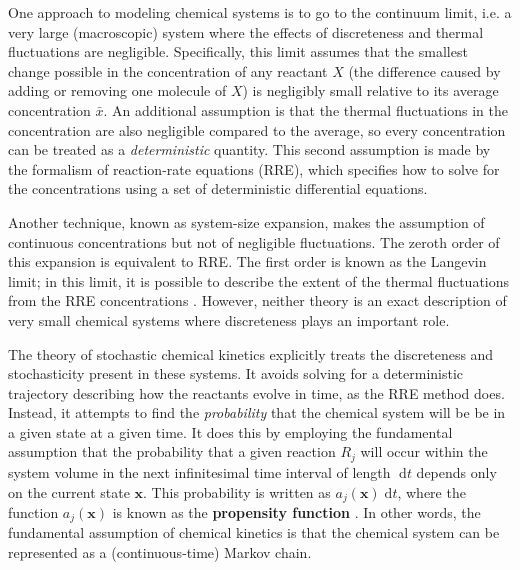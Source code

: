 \documentclass[english,letterpaper,12pt]{report}
\newcommand{\defkeywd}[1]{\textbf{#1}}
\newcommand{\dee}{\;\mathrm{d}}
\renewcommand{\vec}[1]{\ensuremath{\mathbf{#1}}}
\begin{document}
\begin{doublespacing}
One approach to modeling chemical systems is to go to the continuum limit, i.e. a very large (macroscopic) system where the effects of discreteness and thermal fluctuations are negligible. Specifically, this limit assumes that the smallest change possible in the concentration of any reactant $X$ (the difference caused by adding or removing one molecule of $X$) is negligibly small relative to its average concentration $\bar{x}$. An additional assumption is that the thermal fluctuations in the concentration are also negligible compared to the average, so every concentration can be treated as a \emph{deterministic} quantity. This second assumption is made by the formalism of reaction-rate equations (RRE), which specifies how to solve for the concentrations using a set of deterministic differential equations. 

Another technique, known as system-size expansion, makes the assumption of continuous concentrations but not of negligible fluctuations. The zeroth order of this expansion is equivalent to RRE. The first order is known as the Langevin limit; in this limit, it is possible to describe the extent of the thermal fluctuations from the RRE concentrations \cite{langevin-limit}. However, neither theory is an exact description of very small chemical systems where discreteness plays an important role.

The theory of stochastic chemical kinetics explicitly treats the discreteness and stochasticity present in these systems. It avoids solving for a deterministic trajectory describing how the reactants evolve in time, as the RRE method does. Instead, it attempts to find the \emph{probability} that the chemical system will be be in a given state at a given time. It does this by employing the fundamental assumption that the probability that a given reaction $R_j$ will occur within the system volume in the next infinitesimal time interval of length $\dee t$ depends only on the current state $\vec{x}$. This probability is written as $a_j(\vec{x}) \dee t$, where the function $a_j(\vec{x})$ is known as the \defkeywd{propensity function} \cite{gillespie-ssa}. In other words, the fundamental assumption of chemical kinetics is that the chemical system can be represented as a (continuous-time) Markov chain.


\end{doublespacing}
\end{document}
